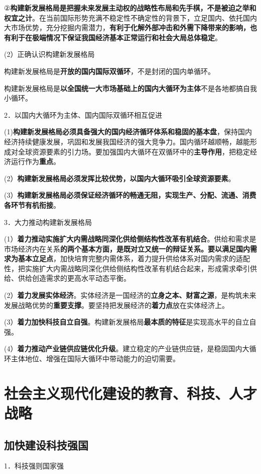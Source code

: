 \documentclass[lang=cn,10pt]{elegantbook}
\begin{document}
	②\textbf{构建新发展格局是把握未来发展主动权的战略性布局和先手棋，不是被迫之举和权宜之计}。在当前国际形势充满不稳定性不确定性的背景下，立足国内、依托国内大市场优势，充分挖掘内需潜力，\textbf{有利于化解外部冲击和外需下降带来的影响，也有利于在极端情况下保证我国经济基本正常运行和社会大局总体稳定}。
	
	(2）正确认识构建新发展格局
	
	构建新发展格局是\textbf{开放的国内国际双循环}，不是封闭的国内单循环。
	
	构建新发展格局是\textbf{以全国统一大市场基础上的国内大循环为主体}不是各地都搞自我小循环。
	
	2．以国内大循环为主体、国内国际双循环相互促进
	
	(1)\textbf{构建新发展格局必须具备强大的国内经济循环体系和稳固的基本盘}，保持国内经济持续健康发展，巩固和发展我国经济的强大竞争力。国内循环越顺畅，越能形成对全球资源要素的引力场。要加强国内大循环在双循环中的\textbf{主导作用}，把稳定经济运行作为\textbf{重点}。
	
	(2）\textbf{构建新发展格局必须发挥比较优势，以国内大循环吸引全球资源要素}。
	
	(3）\textbf{构建新发展格局必须保证经济循环的畅通无阻，实现生产、分配、流通、消费各环节有机衔接}。
	
	3．大力推动构建新发展格局
	
	(1）\textbf{着力推动实施扩大内需战略同深化供给侧结构性改革有机结合}。供给和需求是市场经济内在关系\textbf{的两个基本方面，是既对立又统一的辩证关系。要以满足国内需求为基本立足点}，加快培育完整内需体系，着力提升供给体系对国内需求的适配性，把实施扩大内需战略同深化供给侧结构性改革有机结合起来，形成需求牵引供给、供给创造需求的更高水平动态平衡。
	
	(2）\textbf{着力发展实体经济}。实体经济是一国经济的\textbf{立身之本、财富之源}，是构筑未来发展战略优势的\textbf{重要支撑}。要坚持把发展经济的\textbf{着力点}放在实体经济上。
	
	(3）\textbf{着力加快科技自立自强}。构建新发展格局\textbf{最本质的特征}是实现高水平的自立自强。
	
	(4）\textbf{着力推动产业链供应链优化升级}。建立稳定的产业链供应链，是稳固国内大循环主体地位、增强在国际大循环中带动能力的迫切需要。
	\chapter{社会主义现代化建设的教育、科技、人才战略}
	\section{加快建设科技强国}
	1．科技强则国家强
	
\end{document}
